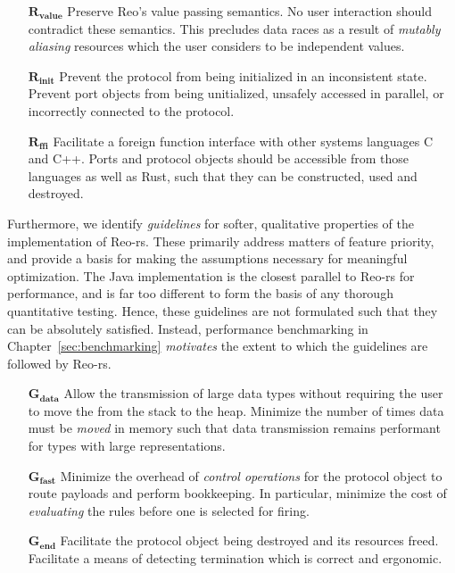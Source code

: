 \begin{enumerate}
	\item[$\boldsymbol{R_{value}}$] Preserve Reo's value passing semantics. No user interaction should contradict these semantics. This precludes data races as a result of \textit{mutably aliasing} resources which the user considers to be independent values.
	
	\item[$\boldsymbol{R_{init}}$] Prevent the protocol from being initialized in an inconsistent state. Prevent port objects from being unitialized, unsafely accessed in parallel, or incorrectly connected to the protocol.
	
	\item[$\boldsymbol{R_{ffi}}$] Facilitate a foreign function interface with other systems languages C and C++. Ports and protocol objects should be accessible from those languages as well as Rust, such that they can be constructed, used and destroyed.
\end{enumerate}

Furthermore, we identify \textit{guidelines} for softer, qualitative properties of the implementation of Reo-rs. These primarily address matters of feature priority, and provide a basis for making the assumptions necessary for meaningful optimization. The Java implementation is the closest parallel to Reo-rs for performance, and is far too different to form the basis of any thorough quantitative testing. Hence, these guidelines are not formulated such that they can be absolutely satisfied. Instead, performance benchmarking in Chapter~\ref{sec:benchmarking} \textit{motivates} the extent to which the guidelines are followed by Reo-rs.
\begin{enumerate}
	\item[$\boldsymbol{G_{data}}$] Allow the transmission of large data types without requiring the user to move the from the stack to the heap. Minimize the number of times data must be \textit{moved} in memory such that data transmission remains performant for types with large representations.	
	
	\item[$\boldsymbol{G_{fast}}$] Minimize the overhead of \textit{control operations} for the protocol object to route payloads and perform bookkeeping. In particular, minimize the cost of \textit{evaluating} the rules before one is selected for firing.
	
	\item[$\boldsymbol{G_{end}}$] Facilitate the protocol object being destroyed and its resources freed. Facilitate a means of detecting termination which is correct and ergonomic.
\end{enumerate}


